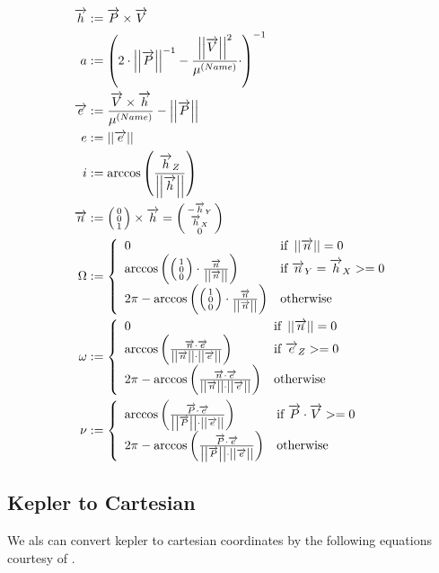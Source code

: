 \documentclass[11pt]{article}
\newcommand{\oa}[1]{\overrightarrow{#1}}
\newcommand{\Pos}{\oa{P}}
\newcommand{\Vel}{\oa{V}}
\newcommand{\absvec}[1]{\left|\left|{#1}\right|\right|}
\newcommand{\dddvec}[3]{\left(\begin{smallmatrix}{#1}\\{#2}\\{#3}\end{smallmatrix}\right)}
\begin{document}
\begin{align}
  \oa{h} &:= \Pos \times \Vel\nonumber\\
  a &:= \left(2\cdot\absvec{\Pos}^{-1} - \frac{\absvec{\Vel}^2}{\mu^{(Name)}}\cdot \right)^{-1}\\
  \oa{e} &:= \frac{\Vel\times \oa{h}}{\mu^{(Name)}} - \absvec{\Pos}\nonumber\\
  e &:= \absvec{\oa{e}}\\
  i &:= \arccos\left(\frac{\oa{h}_Z}{\absvec{\oa{h}}} \right)\\
  \oa{n} & := \dddvec{0}{0}{1} \times \oa{h} = \dddvec{-\oa{h}_Y}{\oa{h}_X}{0}\nonumber\\
  \Omega &:= \left\{
    \begin{array}{l l}
      0 & \textrm{if } \absvec{\oa{n}} = 0\\
      \arccos\left(\dddvec{1}{0}{0}\cdot\frac{\oa{n}}{\absvec{\oa{n}}} \right) & \textrm{if } \oa{n}_Y = \oa{h}_X >= 0\\
      2\pi - \arccos\left(\dddvec{1}{0}{0}\cdot\frac{\oa{n}}{\absvec{\oa{n}}} \right) & \textrm{otherwise}
    \end{array}
    \right.\\
  \omega & := \left\{
    \begin{array}{l l}
      0 & \textrm{if } \absvec{\oa{n}} = 0\\
      \arccos\left(\frac{\oa{n}\cdot\oa{e}}{\absvec{\oa{n}}\cdot\absvec{\oa{e}}} \right) & \textrm{if } \oa{e}_Z >= 0\\
      2\pi - \arccos\left(\frac{\oa{n}\cdot\oa{e}}{\absvec{\oa{n}}\cdot\absvec{\oa{e}}}\right) & \textrm{otherwise}
    \end{array}
    \right.\\
    \nu &:= \left\{
    \begin{array}{l l}
      \arccos\left(\frac{\Pos\cdot\oa{e}}{\absvec{\Pos}\cdot\absvec{\oa{e}}}\right) & \textrm{if } \Pos\cdot\Vel >= 0\\
      2\pi - \arccos\left(\frac{\Pos\cdot\oa{e}}{\absvec{\Pos}\cdot\absvec{\oa{e}}}\right) & \textrm{otherwise}
    \end{array}
    \right.
\end{align}

\subsection{Kepler to Cartesian}

We als can convert kepler to cartesian coordinates by the following
equations courtesy of \cite{RSKC}.
\end{document}
